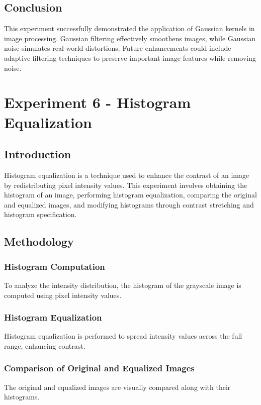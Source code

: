 \documentclass{report}
\begin{document}
\section{Conclusion}
This experiment successfully demonstrated the application of Gaussian kernels in image processing. Gaussian filtering effectively smoothens images, while Gaussian noise simulates real-world distortions. Future enhancements could include adaptive filtering techniques to preserve important image features while removing noise.

\chapter{Experiment 6 - Histogram Equalization}

\section{Introduction}
Histogram equalization is a technique used to enhance the contrast of an image by redistributing pixel intensity values. This experiment involves obtaining the histogram of an image, performing histogram equalization, comparing the original and equalized images, and modifying histograms through contrast stretching and histogram specification.

\section{Methodology}

\subsection{Histogram Computation}
To analyze the intensity distribution, the histogram of the grayscale image is computed using pixel intensity values.

\subsection{Histogram Equalization}
Histogram equalization is performed to spread intensity values across the full range, enhancing contrast.

\subsection{Comparison of Original and Equalized Images}
The original and equalized images are visually compared along with their histograms.
\end{document}

